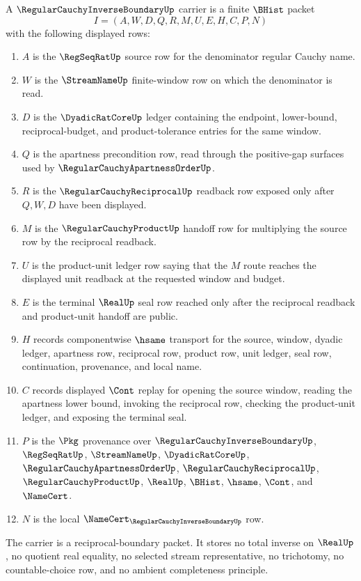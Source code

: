 \begin{definition}
\label{def:regular-cauchy-inverse-boundary-carrier}
A $\RegularCauchyInverseBoundaryUp$ carrier is a finite $\BHist$ packet
$$
I=(A,W,D,Q,R,M,U,E,H,C,P,N)
$$
with the following displayed rows:
\begin{enumerate}
\item $A$ is the $\RegSeqRatUp$ source row for the denominator regular Cauchy name.
\item $W$ is the $\StreamNameUp$ finite-window row on which the denominator is read.
\item $D$ is the $\DyadicRatCoreUp$ ledger containing the endpoint, lower-bound, reciprocal-budget, and product-tolerance entries for the same window.
\item $Q$ is the apartness precondition row, read through the positive-gap surfaces used by $\RegularCauchyApartnessOrderUp$.
\item $R$ is the $\RegularCauchyReciprocalUp$ readback row exposed only after $Q,W,D$ have been displayed.
\item $M$ is the $\RegularCauchyProductUp$ handoff row for multiplying the source row by the reciprocal readback.
\item $U$ is the product-unit ledger row saying that the $M$ route reaches the displayed unit readback at the requested window and budget.
\item $E$ is the terminal $\RealUp$ seal row reached only after the reciprocal readback and product-unit handoff are public.
\item $H$ records componentwise $\hsame$ transport for the source, window, dyadic ledger, apartness row, reciprocal row, product row, unit ledger, seal row, continuation, provenance, and local name.
\item $C$ records displayed $\Cont$ replay for opening the source window, reading the apartness lower bound, invoking the reciprocal row, checking the product-unit ledger, and exposing the terminal seal.
\item $P$ is the $\Pkg$ provenance over $\RegularCauchyInverseBoundaryUp$, $\RegSeqRatUp$, $\StreamNameUp$, $\DyadicRatCoreUp$, $\RegularCauchyApartnessOrderUp$, $\RegularCauchyReciprocalUp$, $\RegularCauchyProductUp$, $\RealUp$, $\BHist$, $\hsame$, $\Cont$, and $\NameCert$.
\item $N$ is the local $\NameCert_{\RegularCauchyInverseBoundaryUp}$ row.
\end{enumerate}
The carrier is a reciprocal-boundary packet. It stores no total inverse on $\RealUp$, no quotient real equality, no selected stream representative, no trichotomy, no countable-choice row, and no ambient completeness principle.
\end{definition}

